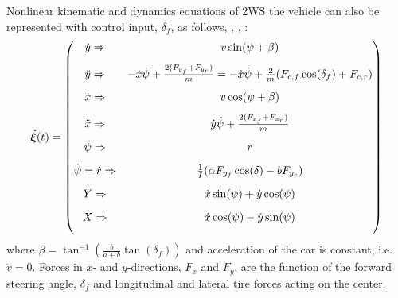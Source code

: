\documentclass[12pt]{article}
\begin{document}
\par Nonlinear kinematic and dynamics equations of 2WS the vehicle can also be represented with control input, $\delta_{f}$, as follows, \cite{Borrelli2005}, \cite{Kong2015}, \cite{Rajamani2011}:
\begin{equation}
	\label{eqn:dynamic_and_kinematic_equations}
	\dot{\bm{\xi}}(t) = \begin{pmatrix}
	\dot{y} \Rightarrow& v\sin(\psi + \beta)\vspace{3mm}\\
	\ddot{y} \Rightarrow& -\dot{x}\dot{\psi} + \frac{2(F_{y_{f}}+F_{y_{r}})}{m} \vspace{3mm} = -\dot{x}\dot{\psi} + \frac{2}{m}(F_{c,f}\cos(\delta_{f})+F_{c,r})\\
	\dot{x} \Rightarrow& v\cos(\psi + \beta)\vspace{3mm}\\
	\ddot{x} \Rightarrow& \dot{y}\dot{\psi} + \frac{2(F_{x_{f}}+F_{x_{r}})}{m} \vspace{3mm}\\
	\dot{\psi} \Rightarrow& r \vspace{3mm}\\
	\ddot{\psi}=\dot{r} \Rightarrow& \frac{1}{I}(\alpha{F}_{y_f}\cos(\delta)-b{F}_{y_r}) \vspace{3mm}\\
	\dot{Y} \Rightarrow& \dot{x}\sin(\psi) + \dot{y}\cos(\psi) \vspace{3mm}\\
	\dot{X} \Rightarrow& \dot{x}\cos(\psi) - \dot{y}\sin(\psi) \vspace{3mm}\\
	\end{pmatrix}  
\end{equation}
where $\beta = \tan^{-1}(\frac{b}{a+b}\tan(\delta_{f}))$ and acceleration of the car is constant, i.e. $\dot{v} = 0$. Forces in $x$- and $y$-directions, $F_x$ and $F_y$, are the function of the forward steering angle, $\delta_{f}$ and longitudinal and lateral tire forces acting on the center. 
\end{document}
